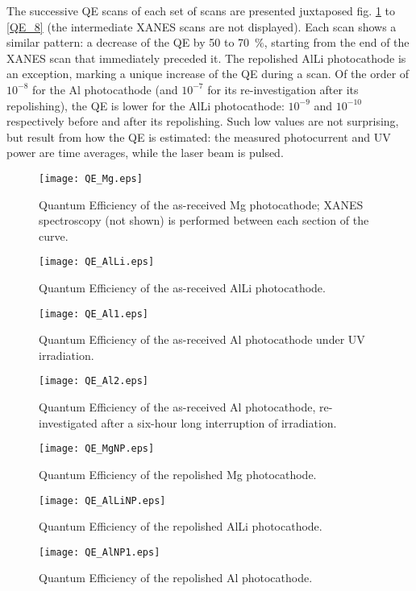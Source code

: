 \documentclass[aip,graphicx]{revtex4-1}
\begin{document}
The successive QE scans of each set of scans are presented juxtaposed fig. \ref{QE_1} to \ref{QE_8} (the intermediate XANES scans are not displayed). Each scan shows a similar pattern: a decrease of the QE by 50 to 70~\%, starting from the end of the XANES scan that immediately preceded it. The repolished AlLi photocathode is an exception, marking a unique increase of the QE during a scan. Of the order of $10^{-8}$ for the Al photocathode (and $10^{-7}$ for its re-investigation after its repolishing), the QE is lower for the AlLi photocathode: $10^{-9}$ and $10^{-10}$ respectively before and after its repolishing. Such low values are not surprising, but result from how the QE is estimated: the measured photocurrent and UV power are time averages, while the laser beam is pulsed.

\begin{figure}
\texttt{[image: QE\_Mg.eps]}%
\caption{Quantum Efficiency of the as-received Mg photocathode; XANES spectroscopy (not shown) is performed between each section of the curve.\label{QE_1}}%
\end{figure}

\begin{figure}
\texttt{[image: QE\_AlLi.eps]}%
\caption{Quantum Efficiency of the as-received AlLi photocathode.}%
\end{figure}

\begin{figure}
\texttt{[image: QE\_Al1.eps]}%
\caption{Quantum Efficiency of the as-received Al photocathode under UV irradiation.}%
\end{figure}

\begin{figure}
\texttt{[image: QE\_Al2.eps]}%
\caption{Quantum Efficiency of the as-received Al photocathode, re-investigated after a six-hour long interruption of irradiation.}%
\end{figure}

\begin{figure}
\texttt{[image: QE\_MgNP.eps]}%
\caption{Quantum Efficiency of the repolished Mg photocathode.}%
\end{figure}

\begin{figure}
\texttt{[image: QE\_AlLiNP.eps]}%
\caption{Quantum Efficiency of the repolished AlLi photocathode.}%
\end{figure}

\begin{figure}
\texttt{[image: QE\_AlNP1.eps]}%
\caption{Quantum Efficiency of the repolished Al photocathode.}%
\end{figure}
\end{document}
